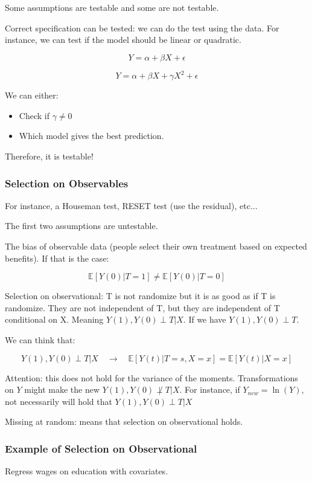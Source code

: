 \documentclass{article}
\begin{document}
Some assumptions are testable and some are not testable.

Correct specification can be tested: we can do the test using the data. For instance, we can test if the model should be linear or quadratic.

$$
Y = \alpha + \beta X + \epsilon
$$

$$
Y = \alpha + \beta X + \gamma X^2 + \epsilon
$$

We can either:
\begin{itemize}
    \item Check if $\gamma \neq 0$
    \item Which model gives the best prediction.
\end{itemize}

Therefore, it is testable!

\subsubsection{Selection on Observables}

For instance, a Houseman test, RESET test (use the residual), etc...

The first two assumptions are untestable.

The bias of observable data (people select their own treatment based on expected benefits). If that is the case:

$$
\mathbb{E}[Y(0) | T = 1] \neq \mathbb{E}[Y(0) | T = 0]
$$

Selection on observational: T is not randomize but it is as good as if T is randomize. They are not independent of T, but they are independent of T conditional on X. Meaning $Y(1), Y(0) \perp T | X$. If we have $Y(1), Y(0) \perp T$.

We can think that:

$$
Y(1), Y(0) \perp T | X \quad \rightarrow \quad \mathbb{E}[Y(t) | T = s, X = x] = \mathbb{E}[Y(t) | X = x]
$$

Attention: this does not hold for the variance of the moments. Transformations on $Y$ might make the new $Y(1), Y(0) \not\perp T | X$. For instance, if $Y_{new} = \ln(Y)$, not necessarily will hold that $Y(1), Y(0) \perp T | X$

Missing at random: means that selection on observational holds.

\subsubsection{Example of Selection on Observational}
Regress wages on education with covariates.
\end{document}

